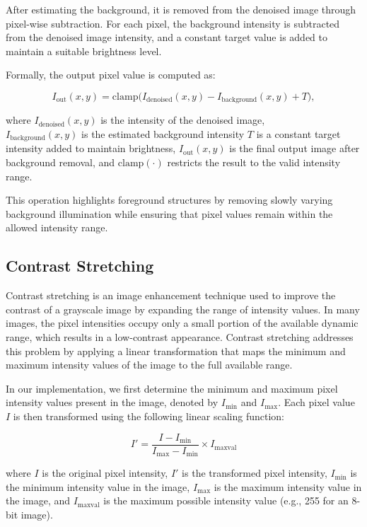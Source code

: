 After estimating the background, it is removed from the denoised image through 
pixel-wise subtraction. For each pixel, the background intensity is subtracted 
from the denoised image intensity, and a constant target value is added to 
maintain a suitable brightness level.

Formally, the output pixel value is computed as:

\[
I_{\text{out}}(x,y) =
\mathrm{clamp}\big(
I_{\text{denoised}}(x,y)
-
I_{\text{background}}(x,y)
+
T
\big),
\]

where $I_{\text{denoised}}(x,y)$ is the intensity of the denoised image,\\
$I_{\text{background}}(x,y)$ is the estimated background intensity
$T$ is a constant target intensity added to maintain brightness,
$I_{\text{out}}(x,y)$ is the final output image after background removal,
and $\mathrm{clamp}(\cdot)$ restricts the result to the valid intensity range.

This operation highlights foreground structures by removing slowly varying 
background illumination while ensuring that pixel values remain within the 
allowed intensity range.

\subsection{Contrast Stretching}


Contrast stretching is an image enhancement technique used to improve the contrast of a grayscale image by expanding the range of intensity values. In many images, the pixel intensities occupy only a small portion of the available dynamic range, which results in a low-contrast appearance. Contrast stretching addresses this problem by applying a linear transformation that maps the minimum and maximum intensity values of the image to the full available range.

In our implementation, we first determine the minimum and maximum pixel intensity values present in the image, denoted by $I_{\min}$ and $I_{\max}$. Each pixel value $I$ is then transformed using the following linear scaling function:

\[
I' = \frac{I - I_{\min}}{I_{\max} - I_{\min}} \times I_{\text{maxval}}
\]

where $I$ is the original pixel intensity, $I'$ is the transformed pixel intensity, $I_{\min}$ is the minimum intensity value in the image, $I_{\max}$ is the maximum intensity value in the image, and $I_{\text{maxval}}$ is the maximum possible intensity value (e.g., 255 for an 8-bit image).

